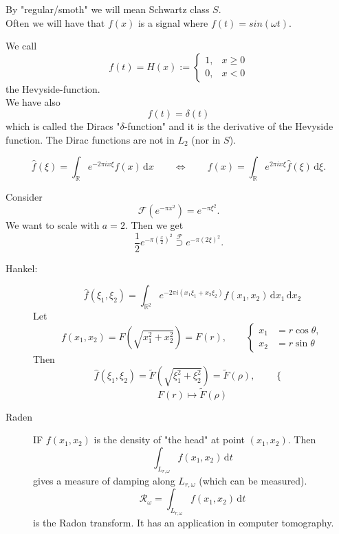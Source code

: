 By "regular/smoth" we will mean Schwartz class $S$. \\
Often we will have that $f(x)$ is a signal where $f(t)= sin(\omega t)$.
\begin{definition*}[Hevyside]
	We call
	\[
		f(t) = H(x) := \begin{cases}
			1, &x \geq 0 \\
			0, &x <0
		\end{cases}
	\]
	the Hevyside-function. \\
	We have also 
	\[
		f(t) = \delta(t)
	\]
	which is called the Diracs "$\delta $-function" and it is the derivative of the Hevyside function. The Dirac functions are not in $L_2$ (nor in $S$).
\end{definition*}
\begin{fundamental}
	\[
		\hat{f}(\xi) = \int_{\mathbb{R}}^{} e^{-2 \pi i x \xi} f(x) \,\mathrm{d}x \qquad \Leftrightarrow \qquad f(x) = \int_{\mathbb{R}}^{}e^{2 \pi i x \xi}\hat{f}(\xi) \,\mathrm{d}\xi.
	\]
\end{fundamental}
\begin{beispiel}
	Consider
	\[
		\mathcal{F}(e^{-\pi x^2}) = e^{- \pi \xi^2}.
	\]
	We want to scale with $a=2$. Then we get
	\[
		\frac{1}{2} e^{- \pi \left( \frac{x}{2} \right)^2} \stackrel{\mathcal{F}}{\supset } e^{-\pi (2 \xi)^2}.
	\]
\end{beispiel}
\begin{description}
	\item[Hankel:]
	\[
		\hat{f}(\xi_1,\xi_2) = \int_{\mathbb{R}^2}^{} e^{- 2 \pi i (x_1 \xi_1 + x_2 \xi_2)} f(x_1,x_2) \,\mathrm{d}x_1 \,\mathrm{d}x_2
	\] 
	Let 
	\[
		f(x_1,x_2) = F( \sqrt{x_1^2+ x_2^2}) = F(r), \qquad \begin{cases}
			x_1 &= r \cos \theta, \\	
			x_2 &= r \sin \theta		
		\end{cases}
	\]
	Then
	\[
		\hat{f}(\xi_1,\xi_2) = \tilde F(\sqrt{\xi_1^2+ \xi_2^2}) = \tilde F(\rho), \qquad \begin{cases}
		\end{cases}
	\]
	\[
		F(r) \mapsto \tilde F( \rho)
	\] 
	\item[Raden] IF $f(x_1,x_2)$ is the density of "the head" at point $(x_1,x_2)$. Then
	\[
		\int_{L_{r,\omega}}^{} f(x_1,x_2) \,\mathrm{d}t
	\]
	gives a measure of damping along $L_{r,\omega}$ (which can be measured).
	\[
		\mathcal{R}_{\omega} = \int_{L_{r,\omega}}^{} f(x_1,x_2) \,\mathrm{d}t
	\]
	is the Radon transform. It has an application in computer tomography.
\end{description}
